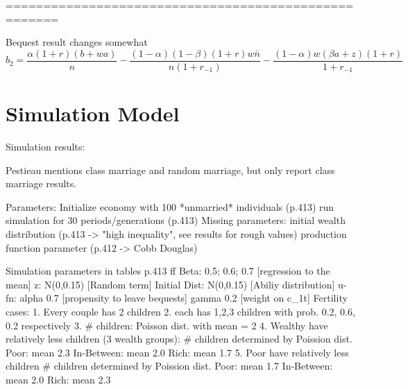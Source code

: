 \documentclass{article}
\begin{document}
=====================================================

Bequest result changes somewhat
\begin{equation}
b_{2} =
\frac{\alpha(1+r)(b+wa)}{n}
- \frac{(1-\alpha)(1-\beta)(1+r)w\bar{n}}{n(1+r_{-1})}
- \frac{(1-\alpha)w(\beta a + z)(1+r)}{1+r_{-1}}
\label{Pestieau11p} \tag{Pestieau 11'}
\end{equation}


\section{Simulation Model}

Simulation results:

Pestieau mentions class marriage and random marriage,
but only report class marriage results.

\begin{verbatimtab}
Parameters:
	Initialize economy with 100 *unmarried* individuals (p.413)
	run simulation for 30 periods/generations (p.413)
Missing parameters:
        initial wealth distribution (p.413 -> "high inequality", see results for rough values)
        production function parameter (p.412 -> Cobb Douglas)

Simulation parameters in tables p.413 ff
	Beta:			0.5; 0.6; 0.7	[regression to the mean]
	z: 				N(0,0.15)		[Random term]
	Initial Dist:	N(0,0.15)		[Abiliy distribution]
	u-fn:	alpha	0.7				[propensity to leave bequests]
			gamma	0.2				[weight on c_1t]
	Fertility cases:
		1. Every couple has 2 children
		2. each has 1,2,3 children with prob. 0.2, 0.6, 0.2 respectively
		3. # children: Poisson dist. with mean = 2
		4. Wealthy have relatively less children (3 wealth groups):
			# children determined by Poission dist.
			Poor: 		mean 2.3
			In-Between: mean 2.0
			Rich:		mean 1.7
		5. Poor have relatively less children
			# children determined by Poission dist.
			Poor:		mean 1.7
			In-Between:	mean 2.0
			Rich:		mean 2.3
\end{verbatimtab}
\end{document}
